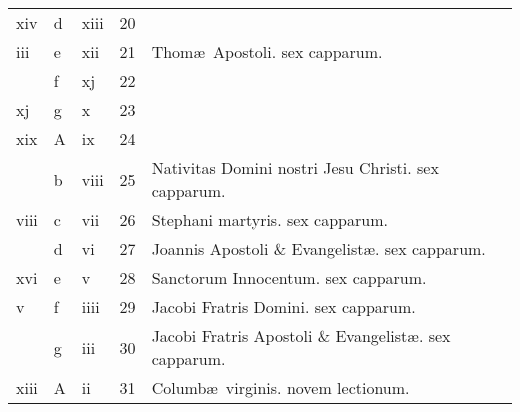 \documentclass[openany]{book}
\begin{document}
\begin{center}
\begin{tabular}{l | l | l | r | l r}
\color{Red} xiv & d & \color{Red} xiii & 20 & & \color{Red} \\
\color{Red} iii & e & \color{Red} xii & 21 & \color{Red} Thom\ae \ Apostoli. \color{black} sex capparum. & \color{Red} \\
\color{Red}  & f & \color{Red} xj & 22 & & \color{Red} \\
\color{Red} xj & g & \color{Red} x & 23 & & \color{Red} \\
\color{Red} xix & \color{Red} A & \color{Red} ix & 24 & & \color{Red} \\
\color{Red}  & b & \color{Red} viii & 25 & \color{Red} Nativitas Domini nostri Jesu Christi. \color{black} sex capparum. & \color{Red} \\
\color{Red} viii & c & \color{Red} vii & 26 & \color{Red} Stephani martyris. \color{black} sex capparum. & \color{Red} \\
\color{Red}  & d & \color{Red} vi & 27 & \color{Red} Joannis Apostoli \& Evangelist\ae . \color{black} sex capparum. & \color{Red} \\
\color{Red} xvi & e & \color{Red} v & 28 & \color{Red} Sanctorum Innocentum. \color{black} sex capparum. & \color{Red} \\
\color{Red} v & f & \color{Red} iiii & 29 & Jacobi Fratris Domini. \color{Red} sex capparum. & \color{Red} \\
\color{Red}  & g & \color{Red} iii & 30 & Jacobi Fratris Apostoli \& Evangelist\ae . \color{Red} sex capparum. & \color{Red} \\
\color{Red} xiii & \color{Red} A & \color{Red} ii & 31 & Columb\ae \ virginis. \color{Red} novem lectionum. & \color{Red} \\
\end{tabular}
\end{center}


\end{document}
